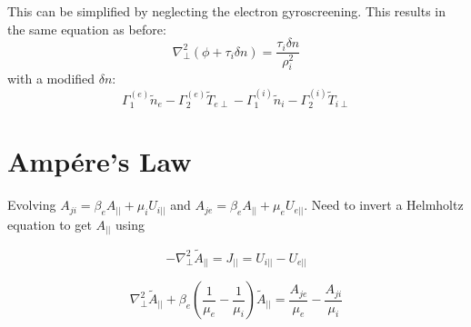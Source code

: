 \documentclass[12pt]{article}
\begin{document}
This can be simplified by neglecting the electron gyroscreening. This
results in the same equation as before:
\begin{equation}
\nabla_\perp^2\left(\phi + \tau_i\delta n\right) = \frac{\tau_i\delta n}{\rho_i^2}
\end{equation}
with a modified $\delta n$:
\[
\Gamma_1^{\left(e\right)}\tilde{n}_e - \Gamma_2^{\left(e\right)}\tilde{T}_{e\perp} - \Gamma_1^{\left(i\right)}\tilde{n}_i - \Gamma_2^{\left(i\right)}\tilde{T}_{i\perp}
\]

\section{Amp\'ere's Law}

Evolving $A_{ji} = \beta_eA_{||} + \mu_iU_{i||}$ and $A_{je} = \beta_eA_{||} + \mu_eU_{e||}$. Need to invert a Helmholtz equation to get $A_{||}$
using

\[
-\nabla_\perp^2\tilde{A}_{||} = J_{||} = U_{i||} - U_{e||}
\]

\[
\nabla_\perp^2\tilde{A}_{||} + \beta_e\left(\frac{1}{\mu_e} - \frac{1}{\mu_i}\right)\tilde{A}_{||} = \frac{A_{je}}{\mu_e} - \frac{A_{ji}}{\mu_i}
\]
\end{document}
